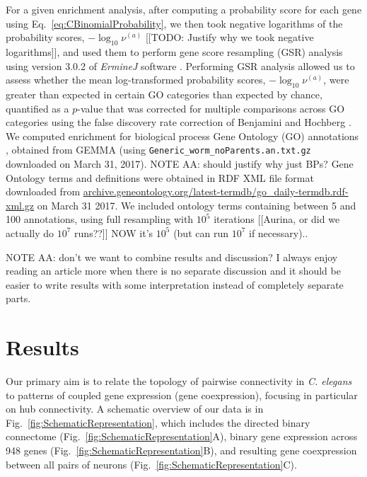 \documentclass[10pt,letterpaper]{article}
\begin{document}
For a given enrichment analysis, after computing a probability score for each gene using Eq.~\eqref{eq:CBinomialProbability}, we then took negative logarithms of the probability scores, $-\log_{10}\nu^{(a)}$ [[TODO: Justify why we took negative logarithms]], and used them to perform gene score resampling (GSR) analysis using version 3.0.2 of \emph{ErmineJ} software \cite{Gillis2010}.
Performing GSR analysis allowed us to assess whether the mean log-transformed probability scores, $-\log_{10}\nu^{(a)}$, were greater than expected in certain GO categories than expected by chance, quantified as a $p$-value that was corrected for multiple comparisons across GO categories using the false discovery rate correction of Benjamini and Hochberg \cite{Benjamini:1995cd}.
We computed enrichment for biological process Gene Ontology (GO) annotations \cite{Ashburner2000}, obtained from GEMMA \cite{Zoubarev2012} (using \texttt{Generic\_worm\_noParents.an.txt.gz} downloaded on March 31, 2017).
NOTE AA: should justify why just BPs?
Gene Ontology terms and definitions were obtained in RDF XML file format downloaded from \url{archive.geneontology.org/latest-termdb/go_daily-termdb.rdf-xml.gz} on March 31 2017.
We included ontology terms containing between 5 and 100 annotations, using full resampling with $10^{5}$ iterations [[Aurina, or did we actually do $10^{7}$ runs??]] NOW it's $10^{5}$ (but can run $10^{7}$ if necessary)..

NOTE AA: don't we want to combine results and discussion? I always enjoy reading an article more when there is no separate discussion and it should be easier to write results with some interpretation instead of completely separate parts.
\section*{Results}

Our primary aim is to relate the topology of pairwise connectivity in \emph{C. elegans} to patterns of coupled gene expression (gene coexpression), focusing in particular on hub connectivity.
A schematic overview of our data is in Fig.~\ref{fig:SchematicRepresentation}, which includes the directed binary connectome (Fig.~\ref{fig:SchematicRepresentation}A), binary gene expression across 948 genes (Fig.~\ref{fig:SchematicRepresentation}B), and resulting gene coexpression between all pairs of neurons (Fig.~\ref{fig:SchematicRepresentation}C).
\end{document}
